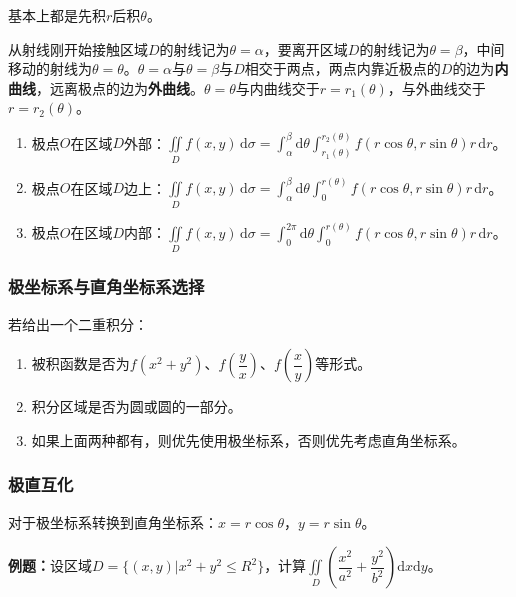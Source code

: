 \documentclass[UTF8, 12pt]{ctexart}
\begin{document}
        基本上都是先积$r$后积$\theta$。

        从射线刚开始接触区域$D$的射线记为$\theta=\alpha$，要离开区域$D$的射线记为$\theta=\beta$，中间移动的射线为$\theta=\theta$。$\theta=\alpha$与$\theta=\beta$与$D$相交于两点，两点内靠近极点的$D$的边为\textbf{内曲线}，远离极点的边为\textbf{外曲线}。$\theta=\theta$与内曲线交于$r=r_1(\theta)$，与外曲线交于$r=r_2(\theta)$。

        \begin{enumerate}
            \item 极点$O$在区域$D$外部：$\iint\limits_Df(x,y)\,\textrm{d}\sigma=\int_\alpha^\beta\textrm{d}\theta\int_{r_1(\theta)}^{r_2(\theta)}f(r\cos\theta,r\sin\theta)r\,\textrm{d}r$。
            \item 极点$O$在区域$D$边上：$\iint\limits_Df(x,y)\,\textrm{d}\sigma=\int_\alpha^\beta\textrm{d}\theta\int_0^{r(\theta)}f(r\cos\theta,r\sin\theta)r\,\textrm{d}r$。
            \item 极点$O$在区域$D$内部：$\iint\limits_Df(x,y)\,\textrm{d}\sigma=\int_0^{2\pi}\textrm{d}\theta\int_0^{r(\theta)}f(r\cos\theta,r\sin\theta)r\,\textrm{d}r$。
        \end{enumerate}

        \subsubsection{极坐标系与直角坐标系选择}

        若给出一个二重积分：

        \begin{enumerate}
            \item 被积函数是否为$f(x^2+y^2)$、$f\left(\dfrac{y}{x}\right)$、$f\left(\dfrac{x}{y}\right)$等形式。
            \item 积分区域是否为圆或圆的一部分。
            \item 如果上面两种都有，则优先使用极坐标系，否则优先考虑直角坐标系。
        \end{enumerate}

        \subsubsection{极直互化}

        对于极坐标系转换到直角坐标系：$x=r\cos\theta$，$y=r\sin\theta$。

        \textbf{例题：}设区域$D=\{(x,y)|x^2+y^2\leqslant R^2\}$，计算$\displaystyle{\iint\limits_D\left(\dfrac{x^2}{a^2}+\dfrac{y^2}{b^2}\right)\textrm{d}x\textrm{d}y}$。
\end{document}
